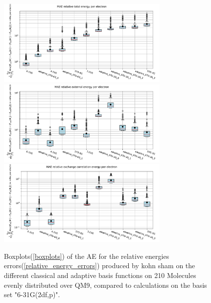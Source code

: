 \begin{figure}
    \centering
    \includegraphics[width=0.75\textwidth]{chapters/results/results_images/adaptive_basis_functions/relative_total_energy_adaptive_basis_sets}
    \includegraphics[width=0.75\textwidth]{chapters/results/results_images/adaptive_basis_functions/relative_coulomb_energy_adaptive_basis_sets}
    \includegraphics[width=0.75\textwidth]{chapters/results/results_images/adaptive_basis_functions/relative_exchange_correlation_energy_adaptive_basis_sets}
    \caption{Boxplots(\ref{boxplots}) of the AE for the relative energies errors(\ref{relative_energy_errors}) produced by kohn sham on the different classical and adaptive basis functions on 210 Molecules evenly distributed over QM9, compared to calculations on the basis set "6-31G(2df,p)".}
    \label{fig:AE_relative_energies_adaptive_basis_sets}
\end{figure}

